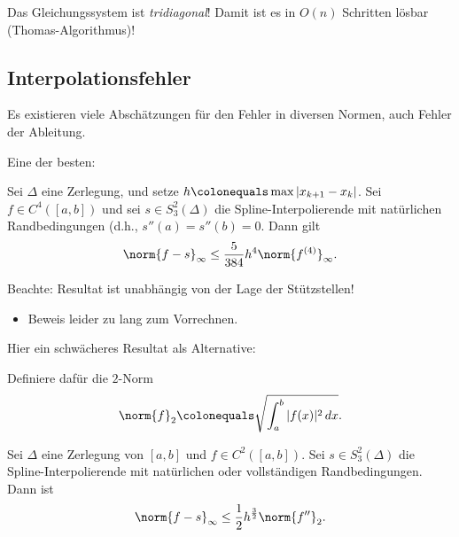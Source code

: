 \bigskip

Das Gleichungssystem ist \emph{tridiagonal}!  Damit ist es in $O(n)$ Schritten lösbar
(Thomas-Algorithmus)!


\subsection{Interpolationsfehler}

Es existieren viele Abschätzungen für den Fehler in diversen Normen, auch Fehler der Ableitung.

\bigskip

Eine der besten:

\begin{satz}
 Sei $\Delta$ eine Zerlegung, und setze $h \colonequals \max\vert x_{k+1} - x_k\vert$.
 Sei $f\in C^4(\left[a, b\right])$ und sei $s \in S^2_3(\Delta)$ die Spline-Interpolierende mit natürlichen
 Randbedingungen (d.h., $s''(a) = s''(b) = 0$. Dann gilt
 \[
  \norm{f - s}_\infty \leq \frac{5}{384}h^4 \norm{f^{(4)}}_\infty.
 \]
\end{satz}

Beachte: Resultat ist unabhängig von der Lage der Stützstellen!
\begin{itemize}
  \item Beweis leider zu lang zum Vorrechnen.
\end{itemize}
Hier ein schwächeres Resultat als Alternative:

\medskip

Definiere dafür die $2$-Norm
\begin{equation*}
 \norm{f}_2 \colonequals \sqrt{\int_a^b\vert f(x)\vert^2\,dx}.
\end{equation*}

\begin{satz}
  Sei $\Delta$ eine Zerlegung von $\left[a, b\right]$ und $f \in C^2(\left[a, b\right])$.
  Sei $s\in S_3^2(\Delta)$ die Spline-Interpolierende mit natürlichen oder vollständigen Randbedingungen.
  Dann ist
  \begin{equation*}
   \norm{f-s}_\infty \leq \frac{1}{2}h^{\frac{3}{2}}\norm{f''}_2.
  \end{equation*}
\end{satz}


